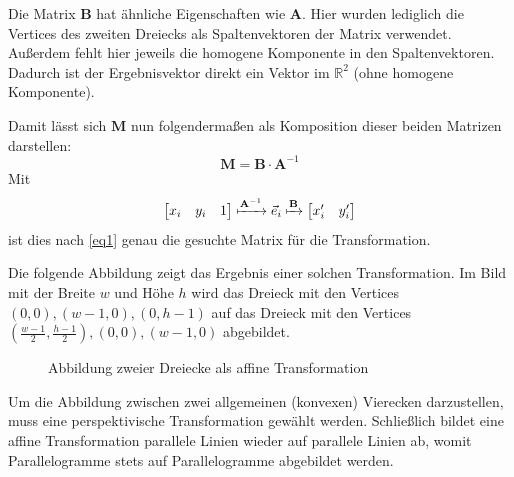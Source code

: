 \documentclass{whswinvcbook}
\begin{document}
Die Matrix $\mathbf{B}$ hat ähnliche Eigenschaften wie $\mathbf{A}$. Hier wurden lediglich die Vertices des zweiten Dreiecks als Spaltenvektoren der Matrix verwendet. Außerdem fehlt hier jeweils die homogene Komponente in den Spaltenvektoren. Dadurch ist der Ergebnisvektor direkt ein Vektor im $\mathbb{R}^2$ (ohne homogene Komponente).

Damit lässt sich $\mathbf{M}$ nun folgendermaßen als Komposition dieser beiden Matrizen darstellen:$$\mathbf{M}=\mathbf{B}\cdot\mathbf{A}^{-1}$$
Mit $$\begin{bmatrix}x_i&y_i&1\end{bmatrix}\xmapsto{\mathbf{A}^{-1}}\vec{e}_i\xmapsto{\mathbf{B}}\begin{bmatrix}x_i^\prime&y_i^\prime\end{bmatrix}$$ ist dies nach \ref{eq1} genau die gesuchte Matrix für die Transformation.

Die folgende Abbildung zeigt das Ergebnis einer solchen Transformation. Im Bild mit der Breite $w$ und Höhe $h$ wird das Dreieck mit den Vertices $(0,0),(w-1,0),(0,h-1)$ auf das Dreieck mit den Vertices $(\frac{w-1}{2},\frac{h-1}{2}),(0,0),(w-1,0)$ abgebildet.
\begin{figure}[H]
    \centering
    \quad\quad\quad\quad
    \caption{Abbildung zweier Dreiecke als affine Transformation}
    \label{fig-opencv-affine-2}
\end{figure}
Um die Abbildung zwischen zwei allgemeinen (konvexen) Vierecken darzustellen, muss eine perspektivische Transformation gewählt werden. Schließlich bildet eine affine Transformation parallele Linien wieder auf parallele Linien ab, womit Parallelogramme stets auf Parallelogramme abgebildet werden.
\end{document}
